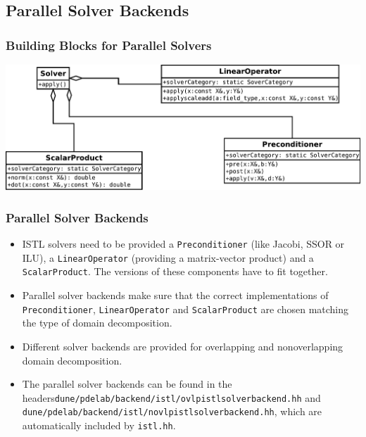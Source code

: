 \documentclass[aspectratio=169,11pt]{beamer}
\theoremstyle{definition}
\begin{document}
\subsection{Parallel Solver Backends}
\begin{frame}
  \frametitle<presentation>{Building Blocks for Parallel Solvers}
  \includegraphics[width=\textwidth]{istlsolver}
\end{frame}

\begin{frame}
  \frametitle<presentation>{Parallel Solver Backends}

\begin{itemize}
\item ISTL solvers need to be provided a \lstinline!Preconditioner! (like Jacobi, SSOR or ILU), a
\lstinline!LinearOperator! (providing a matrix-vector product) and
a \lstinline!ScalarProduct!. The versions of these components have to fit together.
\item Parallel solver backends make sure that the correct implementations of
\lstinline!Preconditioner!, \lstinline!LinearOperator! and \lstinline!ScalarProduct!
are chosen matching the type of domain decomposition.
\item Different solver backends are provided for overlapping and nonoverlapping domain
decomposition.
\item The parallel solver backends can be found in the headers\newline \lstinline!dune/pdelab/backend/istl/ovlpistlsolverbackend.hh! and \newline
\lstinline!dune/pdelab/backend/istl/novlpistlsolverbackend.hh!,\newline
which are automatically included by \lstinline!istl.hh!.
\end{itemize}

\end{frame}

\end{document}
